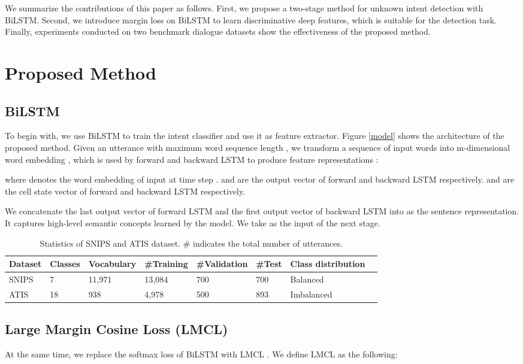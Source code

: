 \documentclass[11pt,a4paper]{article}
\begin{document}
We summarize the contributions of this paper as follows. First, we propose a two-stage method for unknown intent detection with BiLSTM. Second, we introduce margin loss on BiLSTM to learn discriminative deep features, which is suitable for the detection task. Finally, experiments conducted on two benchmark dialogue datasets show the effectiveness of the proposed method. 

\section{Proposed Method}
\subsection{BiLSTM}
To begin with, we use BiLSTM \cite{mesnil2015using} to train the intent classifier and use it as feature extractor. Figure \ref{model} shows the architecture of the proposed method. Given an utterance with maximum word sequence length , we transform a sequence of input words  into m-dimensional word embedding , which is used by forward and backward LSTM to produce feature representations : 
 
where  denotes the word embedding of input at time step .  and  are the output vector of forward and backward LSTM respectively.   and  are the cell state vector of forward and backward LSTM respectively.

We concatenate the last output vector of forward LSTM  and the first output vector of backward LSTM  into  as the sentence representation. It captures high-level semantic concepts learned by the model. We take  as the input of the next stage. 

\begin{table*}[t!]
\centering
\begin{tabular}{llllllll}
\toprule
  Dataset & Classes & Vocabulary & \#Training & \#Validation & \#Test & Class distribution \\
  \hline
  SNIPS & 7 & 11,971 & 13,084 & 700 & 700 & Balanced \\
  ATIS & 18 & 938 & 4,978 & 500 & 893 & Imbalanced\\
\bottomrule
\end{tabular}
\caption{ \label{data-stat-table}  Statistics of SNIPS and ATIS dataset. \# indicates the total number of utterances.}
\end{table*}

\subsection{Large Margin Cosine Loss (LMCL)}
At the same time, we replace the softmax loss of BiLSTM with LMCL \cite{2018arXiv181009136N}. We define LMCL as the following:
\end{document}
